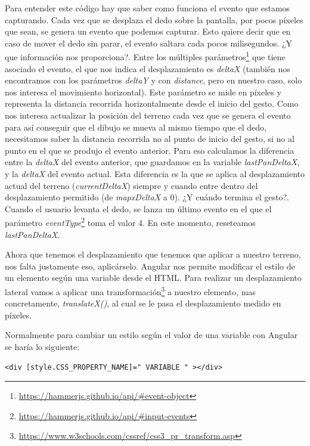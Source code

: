 Para entender este código hay que saber como funciona el evento que estamos capturando. Cada vez que se desplaza el dedo sobre la pantalla, por pocos píxeles que sean, se genera un evento que podemos capturar. Esto quiere decir que en caso de mover el dedo sin parar, el evento saltara cada pocos milisegundos. ¿Y que información nos proporciona?. Entre los múltiples parámetros\footnote{\url{https://hammerjs.github.io/api/\#event-object}} que tiene asociado el evento, el que nos indica el desplazamiento es \emph{deltaX} (también nos encontramos con los parámetros \emph{deltaY} y con \emph{distance}, pero en nuestro caso, solo nos interesa el movimiento horizontal). Este parámetro se mide en píxeles y representa la distancia recorrida horizontalmente desde el inicio del gesto. Como nos interesa actualizar la posición del terreno cada vez que se genera el evento para así conseguir que el dibujo se mueva al mismo tiempo que el dedo, necesitamos saber la distancia recorrida no al punto de inicio del gesto, si no al punto en el que se produjo el evento anterior. Para eso calculamos la diferencia entre la \emph{deltaX} del evento anterior, que guardamos en la variable \emph{lastPanDeltaX}, y la \emph{deltaX} del evento actual. Esta diferencia es la que se aplica al desplazamiento actual del terreno (\emph{currentDeltaX}) siempre y cuando entre dentro del desplazamiento permitido (de \emph{mapxDeltaX} a 0). ¿Y cuándo termina el gesto?. Cuando el usuario levanta el dedo, se lanza un último evento en el que el parámetro \emph{eventType}\footnote{\url{https://hammerjs.github.io/api/\#input-events}} toma el valor 4. En este momento, reseteamos \emph{lastPanDeltaX}.

Ahora que tenemos el desplazamiento que tenemos que aplicar a nuestro terreno, nos falta justamente eso, aplicárselo. Angular nos permite modificar el estilo de un elemento según una variable desde el HTML. Para realizar un desplazamiento lateral vamos a aplicar una transformación\footnote{\url{https://www.w3schools.com/cssref/css3_pr_transform.asp}} a nuestro elemento, mas concretamente, \emph{translateX()}, al cual se le pasa el desplazamiento medido en píxeles.

Normalmente para cambiar un estilo según el valor de una variable con Angular se haría lo siguiente:

{\begin{lstlisting}[style=htmlcssjs,frame=tlrb, xleftmargin={0.2cm}]
  <div [style.CSS_PROPERTY_NAME]=" VARIABLE " ></div>
\end{lstlisting}}

